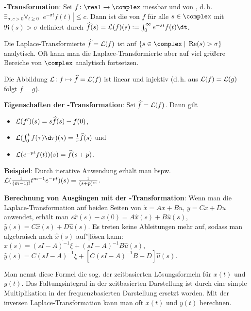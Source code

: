 \textbf{-Transformation}:
Sei $f\colon \real \rightarrow \complex$ messbar und von
, d.\,h.
$\exists_{\sigma, c > 0} \forall_{t \ge 0}\; |e^{-\sigma t} f(t)| \le c$.
Dann ist die  von $f$ für alle
$s \in \complex$ mit $\Re(s) > \sigma$ definiert durch
$\widehat{f}(s) = \L(f)(s) := \int_0^\infty e^{-st} f(t) \dt$.

Die Laplace-Transformierte $\widehat{f} = \mathcal{L}(f)$ ist auf
$\{s \in \complex \;|\; \Re(s) > \sigma\}$ analytisch.
Oft kann man die Laplace-Transformierte aber auf viel größere Bereiche von $\complex$
analytisch fortsetzen.

Die Abbildung $\mathcal{L}\colon f \mapsto \widehat{f} = \mathcal{L}(f)$ ist linear und injektiv
(d.\,h. aus $\mathcal{L}(f) = \mathcal{L}(g)$ folgt $f = g$).

\textbf{Eigenschaften der -Transformation}:
Sei $\widehat{f} = \mathcal{L}(f)$.
Dann gilt
\begin{itemize}
    \item
    $\mathcal{L}(f')(s) = s \widehat{f}(s) - f(0)$,
    
    \item
    $\L(\int_0^t f(\tau)\d\tau)(s) = \frac{1}{s} \widehat{f}(s)$ und
    
    \item
    $\mathcal{L}(e^{-pt} f(t))(s) = \widehat{f}(s + p)$.
\end{itemize}

\textbf{Beispiel}:
Durch iterative Anwendung erhält man bspw.
$\mathcal{L}(\frac{1}{(m-1)!} t^{m-1} e^{-pt})(s) = \frac{1}{(s + p)^m}$.

\linie

\textbf{Berechnung von Ausgängen mit der -Transformation}:
Wenn man die Laplace-Transformation auf beiden Seiten von $\dot{x} = Ax + Bu$, $y = Cx + Du$
anwendet, erhält man
$s \widehat{x}(s) - x(0) = A\widehat{x}(s) + B\widehat{u}(s)$,
$\widehat{y}(s) = C\widehat{x}(s) + D\widehat{u}(s)$.
Es treten keine Ableitungen mehr auf, sodass man algebraisch nach $\widehat{x}(s)$ auf"|lösen kann:
$\widehat{x}(s) = (sI - A)^{-1} \xi + (sI - A)^{-1} B \widehat{u}(s)$,
$\widehat{y}(s) = C (sI - A)^{-1} \xi + [C (sI - A)^{-1} B + D] \widehat{u}(s)$.

Man nennt diese Formel die sog. 
der zeitbasierten Lösungsformeln für $x(t)$ und $y(t)$.
Das Faltungsintegral in der zeitbasierten Darstellung ist durch eine simple Multiplikation
in der frequenzbasierten Darstellung ersetzt worden.
Mit der inversen Laplace-Transformation kann man oft $x(t)$ und $y(t)$ berechnen.


